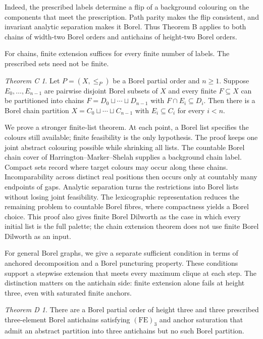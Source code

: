 \documentclass[11pt,reqno]{amsart}
\theoremstyle{plain}
\theoremstyle{definition}
\theoremstyle{remark}
\newtheorem{theoremC}{Theorem C}
\newtheorem{theoremD}{Theorem D}
\begin{document}
Indeed, the prescribed labels determine a flip of a background
colouring on the components that meet the prescription. Path parity
makes the flip consistent, and invariant analytic separation makes it
Borel. Thus Theorem B applies to both chains of width-two Borel orders
and antichains of height-two Borel orders.

For chains, finite extension suffices for every finite number of
labels. The prescribed sets need not be finite.

\begin{theoremC}
Let $P=(X,\le_P)$ be a Borel partial order and $n\ge1$. Suppose
$E_0,\ldots,E_{n-1}$ are pairwise disjoint Borel subsets of $X$ and
every finite $F\subseteq X$ can be partitioned into chains
$F=D_0\sqcup\cdots\sqcup D_{n-1}$ with $F\cap E_i\subseteq D_i$.
Then there is a Borel chain partition
$X=C_0\sqcup\cdots\sqcup C_{n-1}$ with $E_i\subseteq C_i$ for every
$i<n$.
\end{theoremC}

We prove a stronger finite-list theorem. At each point, a Borel list
specifies the colours still available; finite feasibility is the only
hypothesis. The proof keeps one joint abstract colouring possible while
shrinking all lists. The countable Borel chain cover of
Harrington--Marker--Shelah supplies a background chain label. Compact
sets record where target colours may occur along these chains.
Incomparability across distinct real positions then occurs only at
countably many endpoints of gaps. Analytic separation turns the
restrictions into Borel lists without losing joint feasibility. The
lexicographic representation reduces the remaining problem to
countable Borel fibres, where compactness yields a Borel choice. This
proof also gives finite Borel Dilworth as the case in which every
initial list is the full palette; the chain extension theorem does
not use finite Borel Dilworth as an input.

For general Borel graphs, we give a separate sufficient condition in
terms of anchored decomposition and a Borel puncturing property.
These conditions support a stepwise extension that meets every
maximum clique at each step. The distinction matters on the
antichain side: finite extension alone fails at height three, even
with saturated finite anchors.

\begin{theoremD}
There are a Borel partial order of height three and three prescribed
three-element Borel antichains satisfying $\mathrm{(FE)}_3$ and anchor
saturation that admit an abstract partition into three antichains
but no such Borel partition.
\end{theoremD}
\end{document}
